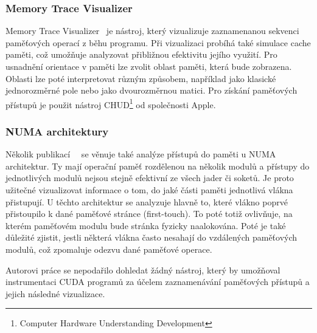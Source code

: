 \subsubsection*{Memory Trace Visualizer}
Memory Trace Visualizer~\cite{mtv} je nástroj, který vizualizuje zaznamenanou sekvenci paměťových operací z běhu programu. Při vizualizaci probíhá také simulace cache paměti, což umožňuje analyzovat přibližnou efektivitu jejího využití. Pro usnadnění orientace v paměti lze zvolit oblast paměti, která bude zobrazena. Oblasti lze poté interpretovat různým způsobem, například jako klasické jednorozměrné pole nebo jako dvourozměrnou matici. Pro získání paměťových přístupů je použit nástroj CHUD\footnote{Computer Hardware Understanding Development} od společnosti Apple.

\subsubsection*{NUMA architektury}
Několik publikací~\cite{numa-visualisation}~\cite{numa-tabarnac} se věnuje také analýze přístupů do paměti u NUMA architektur. Ty mají operační paměť rozdělenou na několik modulů a přístupy do jednotlivých modulů nejsou stejně efektivní ze všech jader či soketů. Je proto užitečné vizualizovat informace o tom, do jaké části paměti jednotlivá vlákna přistupují. U těchto architektur se analyzuje hlavně to, které vlákno poprvé přistoupilo k dané paměťové stránce (first-touch). To poté totiž ovlivňuje, na kterém paměťovém modulu bude stránka fyzicky naalokována. Poté je také důležité zjistit, jestli některá vlákna často nesahají do vzdálených paměťových modulů, což zpomaluje odezvu dané paměťové operace.

Autorovi práce se nepodařilo dohledat žádný nástroj, který by umožňoval instrumentaci CUDA programů za účelem zaznamenávání paměťových přístupů a jejich následné vizualizace.

